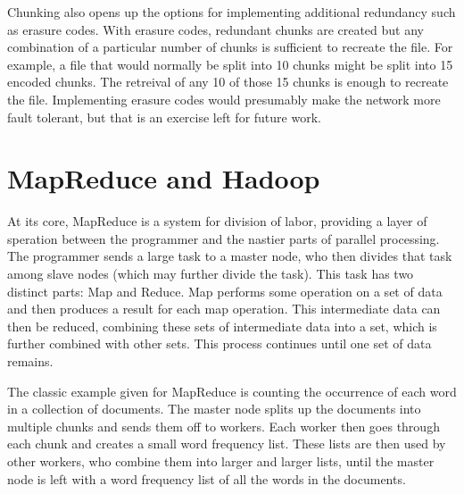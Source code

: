 \documentclass[conference, compsocconf, letterpaper]{IEEEtran}
\begin{document}

Chunking also opens up the options for implementing additional redundancy such as erasure codes\cite{rizzo1997effective}. With erasure codes, redundant chunks are created but any combination of a particular number of chunks is sufficient to recreate the file.  For example, a file that would normally be split into 10 chunks might be split into 15 encoded chunks.  The retreival of any 10 of those 15 chunks is enough to recreate the file.  Implementing erasure codes would presumably make the network more fault tolerant, but that is an exercise left for future work.





\section{MapReduce and Hadoop}
At its core, MapReduce \cite{mapreduce} is a system for division of labor, providing a layer of speration between the programmer and the nastier parts of parallel processing.  The programmer sends a large task to a master node, who then divides that task among slave nodes (which may further divide the task).  This task has two distinct parts: Map and Reduce.  Map performs some operation on a set of data and then produces a result for each map operation.  This intermediate data can then be reduced, combining these sets of intermediate data into a set, which is further combined with other sets.  This process continues until one set of data remains.

The classic example given for MapReduce is counting the occurrence of each word in a collection of documents.  The master node splits up the documents into multiple chunks and sends them off to workers.  Each worker then goes through each chunk and creates a small word frequency list.  These lists are then used by other workers, who combine them into larger and larger lists, until the master node is left with a word frequency list of all the words in the documents. 
\end{document}
